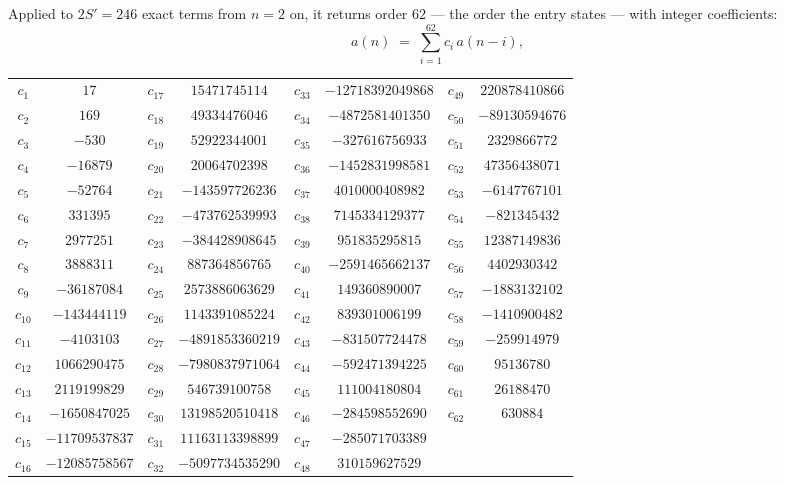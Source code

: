 \documentclass[11pt,a4paper]{article}
\theoremstyle{plain}
\theoremstyle{definition}
\begin{document}
Applied to $2S'=246$ exact terms from $n=2$ on, it returns order $62$ --- the
order the entry states --- with integer coefficients:
\[
a(n)\;=\;\sum_{i=1}^{62}c_i\,a(n-i),
\]
\begin{center}\small
\begin{tabular}{cccccccc}
$c_{1}$ & $17$ & $c_{17}$ & $15471745114$ & $c_{33}$ & $-12718392049868$ & $c_{49}$ & $220878410866$ \\
$c_{2}$ & $169$ & $c_{18}$ & $49334476046$ & $c_{34}$ & $-4872581401350$ & $c_{50}$ & $-89130594676$ \\
$c_{3}$ & $-530$ & $c_{19}$ & $52922344001$ & $c_{35}$ & $-327616756933$ & $c_{51}$ & $2329866772$ \\
$c_{4}$ & $-16879$ & $c_{20}$ & $20064702398$ & $c_{36}$ & $-1452831998581$ & $c_{52}$ & $47356438071$ \\
$c_{5}$ & $-52764$ & $c_{21}$ & $-143597726236$ & $c_{37}$ & $4010000408982$ & $c_{53}$ & $-6147767101$ \\
$c_{6}$ & $331395$ & $c_{22}$ & $-473762539993$ & $c_{38}$ & $7145334129377$ & $c_{54}$ & $-821345432$ \\
$c_{7}$ & $2977251$ & $c_{23}$ & $-384428908645$ & $c_{39}$ & $951835295815$ & $c_{55}$ & $12387149836$ \\
$c_{8}$ & $3888311$ & $c_{24}$ & $887364856765$ & $c_{40}$ & $-2591465662137$ & $c_{56}$ & $4402930342$ \\
$c_{9}$ & $-36187084$ & $c_{25}$ & $2573886063629$ & $c_{41}$ & $149360890007$ & $c_{57}$ & $-1883132102$ \\
$c_{10}$ & $-143444119$ & $c_{26}$ & $1143391085224$ & $c_{42}$ & $839301006199$ & $c_{58}$ & $-1410900482$ \\
$c_{11}$ & $-4103103$ & $c_{27}$ & $-4891853360219$ & $c_{43}$ & $-831507724478$ & $c_{59}$ & $-259914979$ \\
$c_{12}$ & $1066290475$ & $c_{28}$ & $-7980837971064$ & $c_{44}$ & $-592471394225$ & $c_{60}$ & $95136780$ \\
$c_{13}$ & $2119199829$ & $c_{29}$ & $546739100758$ & $c_{45}$ & $111004180804$ & $c_{61}$ & $26188470$ \\
$c_{14}$ & $-1650847025$ & $c_{30}$ & $13198520510418$ & $c_{46}$ & $-284598552690$ & $c_{62}$ & $630884$ \\
$c_{15}$ & $-11709537837$ & $c_{31}$ & $11163113398899$ & $c_{47}$ & $-285071703389$ &  &  \\
$c_{16}$ & $-12085758567$ & $c_{32}$ & $-5097734535290$ & $c_{48}$ & $310159627529$ &  &  \\
\end{tabular}
\end{center}
\end{document}
